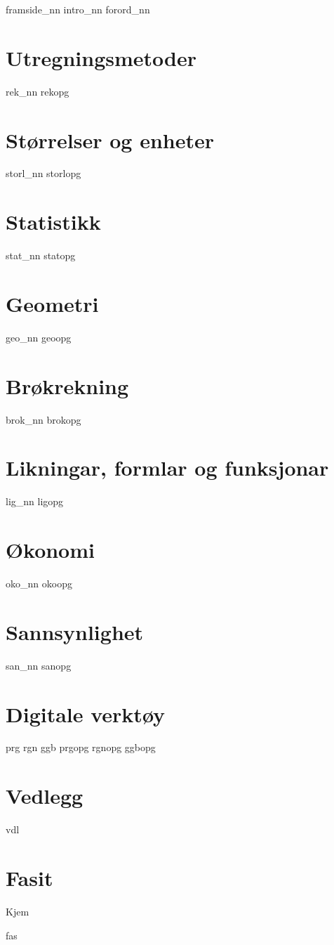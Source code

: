 




{framside_nn}
{intro_nn}
{forord_nn}

\tableofcontents
\chapter{Utregningsmetoder}
\newpage
{rek_nn}
{rekopg}

\chapter{Størrelser og enheter}
\newpage
{storl_nn}
\opgt
{storlopg}

\chapter{Statistikk}
\newpage
{stat_nn}
{statopg}

\chapter{Geometri}
\newpage
{geo_nn}
{geoopg}

\chapter{Brøkrekning \label{Br}}
\newpage
{brok_nn}
\newpage
{brokopg}

\chapter{Likningar, formlar og funksjonar \label{Lig}}
\newpage
{lig_nn}
{ligopg}

\chapter{Økonomi \label{Oko}}
\newpage
{oko_nn}
{okoopg}

\chapter{Sannsynlighet \label{San}} 
\newpage
{san_nn}
{sanopg}

\chapter{Digitale verktøy}
\newpage
{prg}
{rgn}	
{ggb}	
\opgt
{prgopg}
{rgnopg}	
{ggbopg}	

\chapter*{Vedlegg} 
\newpage
{}
{vdl}


\chapter*{Fasit}
Kjem

{fas}






